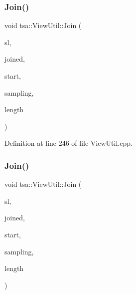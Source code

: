 \subsubsection{\texorpdfstring{Join()}{Join()}\hspace{0.1cm}{\footnotesize\ttfamily [1/3]}}
{\footnotesize\ttfamily void tsa\+::\+View\+Util\+::\+Join (\begin{DoxyParamCaption}\item[{std\+::vector$<$ \hyperlink{namespacetsa_ab32775c889b53c40fa83939f22372b75}{Seq\+View\+Complex} $>$ \&}]{sl,  }\item[{\hyperlink{namespacetsa_ab32775c889b53c40fa83939f22372b75}{Seq\+View\+Complex} \&}]{joined,  }\item[{double}]{start,  }\item[{double}]{sampling,  }\item[{unsigned int}]{length }\end{DoxyParamCaption})\hspace{0.3cm}{\ttfamily [static]}}



Definition at line 246 of file View\+Util.\+cpp.

\mbox{\label{classtsa_1_1_view_util_ad8728d95442741e7dd5f3d74cc917c0c}} 
\subsubsection{\texorpdfstring{Join()}{Join()}\hspace{0.1cm}{\footnotesize\ttfamily [2/3]}}
{\footnotesize\ttfamily void tsa\+::\+View\+Util\+::\+Join (\begin{DoxyParamCaption}\item[{std\+::vector$<$ \hyperlink{namespacetsa_ac599574bcc094eda25613724b8f3ca9e}{Seq\+View\+Double} $>$ \&}]{sl,  }\item[{\hyperlink{namespacetsa_ac599574bcc094eda25613724b8f3ca9e}{Seq\+View\+Double} \&}]{joined,  }\item[{double}]{start,  }\item[{double}]{sampling,  }\item[{unsigned int}]{length }\end{DoxyParamCaption})\hspace{0.3cm}{\ttfamily [static]}}



